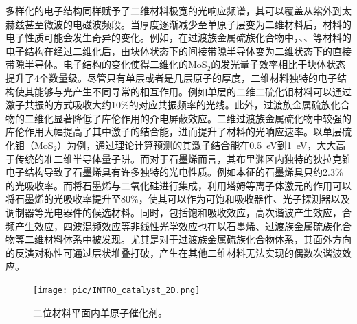     多样化的电子结构同样赋予了二维材料极宽的光响应频谱，其可以覆盖从紫外到太赫兹甚至微波的电磁波频段。当厚度逐渐减少至单原子层变为二维材料后，材料的电子性质可能会发生奇异的变化。例如，在过渡族金属硫族化合物中，、、等材料的电子结构在经过二维化后，由块体状态下的间接带隙半导体变为二维状态下的直接带隙半导体。电子结构的变化使得二维化的MoS$_2$的发光量子效率相比于块体状态提升了4个数量级。尽管只有单层或者是几层原子的厚度，二维材料独特的电子结构使其能够与光产生不同寻常的相互作用。例如单层的二维二硫化钼材料可以通过激子共振的方式吸收大约10\%的对应共振频率的光线。此外，过渡族金属硫族化合物的二维化显著降低了库伦作用的介电屏蔽效应。二维过渡族金属硫化物中较强的库伦作用大幅提高了其中激子的结合能，进而提升了材料的光响应速率。以单层硫化钼（MoS$_2$）为例，通过理论计算预测的其激子结合能在\SI{0.5}{\electronvolt}到\SI{1}{\electronvolt}，大大高于传统的准二维半导体量子阱。而对于石墨烯而言，其布里渊区内独特的狄拉克锥电子结构导致了石墨烯具有许多独特的光电性质。例如本征的石墨烯具只约2.3\%的光吸收率。而将石墨烯与二氧化硅进行集成，利用塔姆等离子体激元的作用可以将石墨烯的光吸收率提升至80\%，使其可以作为可饱和吸收器件、光子探测器以及调制器等光电器件的候选材料。同时，包括饱和吸收效应，高次谐波产生效应，合频产生效应，四波混频效应等非线性光学效应也在以石墨烯、过渡族金属硫族化合物等二维材料体系中被发现。尤其是对于过渡族金属硫族化合物体系，其面外方向的反演对称性可通过层状堆叠打破，产生在其他二维材料无法实现的偶数次谐波效应。
    
    \begin{figure}[htb]
        \texttt{[image: pic/INTRO\_catalyst\_2D.png]}
        \caption{二位材料平面内单原子催化剂。}
        \label{}
    \end{figure}

